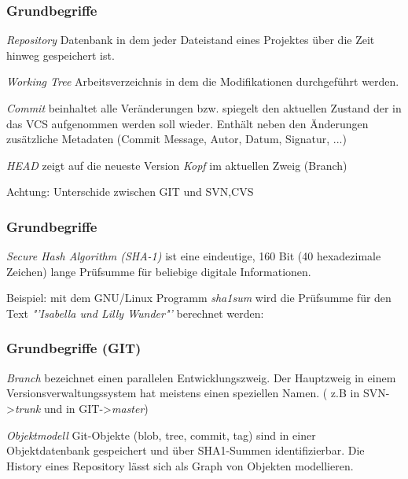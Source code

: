 \documentclass{beamer}
\begin{document}
\begin{frame}\frametitle{Grundbegriffe}
\begin{block}{\textit{Repository}}
Datenbank in dem jeder Dateistand eines Projektes über die Zeit hinweg gespeichert ist.
\end{block}
\begin{block}{\textit{Working Tree}}
Arbeitsverzeichnis in dem die Modifikationen durchgeführt werden.
\end{block}
\begin{block}{\textit{Commit}}
beinhaltet alle Veränderungen bzw. spiegelt den aktuellen Zustand der in das VCS aufgenommen werden soll wieder. Enthält neben den Änderungen zusätzliche Metadaten (Commit Message, Autor, Datum, Signatur, ...)
\end{block}
\begin{block}{\textit{HEAD}}
zeigt auf die neueste Version \textit{Kopf} im aktuellen Zweig (Branch)

Achtung: Unterschide zwischen GIT und SVN,CVS
\end{block}
\end{frame}

\begin{frame}\frametitle{Grundbegriffe}
\begin{block}{\textit{Secure Hash Algorithm (SHA-1)}}
ist eine eindeutige, 160 Bit (40 hexadezimale Zeichen) lange Prüfsumme für beliebige digitale Informationen.
\end{block}
\begin{exampleblock}{Beispiel:}
mit dem GNU/Linux Programm \textit{sha1sum} wird die Prüfsumme für den Text \textit{"'Isabella und Lilly Wunder"'} berechnet werden:

\end{exampleblock}
\end{frame}

\begin{frame}\frametitle{Grundbegriffe (GIT)}
\begin{block}{\textit{Branch}}
bezeichnet einen parallelen Entwicklungszweig. Der Hauptzweig in einem Versionsverwaltungssystem hat meistens einen speziellen Namen. ( z.B in SVN->\textit{trunk} und in GIT->\textit{master})
\end{block}
\begin{block}{\textit{Objektmodell}}
Git-Objekte (blob, tree, commit, tag) sind in einer Objektdatenbank gespeichert und über SHA1-Summen identifizierbar. Die History eines Repository lässt sich als Graph von Objekten modellieren.
\end{block}
\end{frame}
\end{document}
